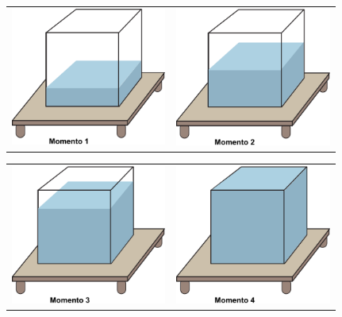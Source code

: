   \begin{center}
  \begin{tabular}{cc}
  \includegraphics[width=145pt, keepaspectratio]{../figuras/licao03/ativ1_fig01.png}  & \includegraphics[width=145pt, keepaspectratio]{../figuras/licao03/ativ1_fig02.png}
  \end{tabular}\newline
  \begin{tabular}{cc}
  \includegraphics[width=145pt, keepaspectratio]{../figuras/licao03/ativ1_fig03.png}  & \includegraphics[width=145pt, keepaspectratio]{../figuras/licao03/ativ1_fig04.png}
  \end{tabular}
  \end{center}

